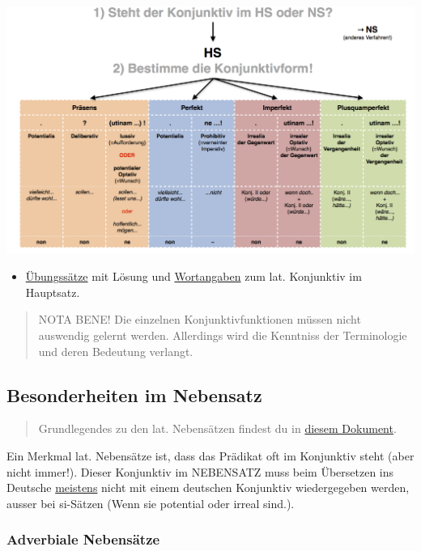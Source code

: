 \documentclass{scrartcl}
\begin{document}
\begin{center}
\includegraphics[width=.9\linewidth]{KonjHS.jpg}
\label{org364b6e5}
\end{center} 

\begin{itemize}
\item \href{https://www.dropbox.com/s/sltkmozc04i5xwl/Konjunktiv.pdf?dl=0}{Übungssätze} mit Lösung und \href{https://www.dropbox.com/s/uicgeuj6n24kj97/Konjunktiv\_Wortangaben.pdf?dl=0}{Wortangaben} zum lat. Konjunktiv im
Hauptsatz.
\end{itemize}

\begin{quote}
NOTA BENE!
Die einzelnen Konjunktivfunktionen müssen nicht auswendig gelernt werden.
Allerdings wird die Kenntniss der Terminologie und deren Bedeutung verlangt.
\end{quote}

\subsection{Besonderheiten im Nebensatz}
\label{sec:org162e264}

\begin{quote}
Grundlegendes zu den lat. Nebensätzen findest du in \href{https://www.dropbox.com/s/fw6yy5i00lxn5iy/Lat\_Nebens\%25C3\%25A4tze.pdf?dl=0}{diesem Dokument}.
\end{quote}


Ein Merkmal lat. Nebensätze ist, dass das Prädikat oft im Konjunktiv
steht (aber nicht immer!). Dieser Konjunktiv im NEBENSATZ muss beim
Übersetzen ins Deutsche \uline{meistens} nicht mit einem deutschen Konjunktiv
wiedergegeben werden, ausser bei si-Sätzen (Wenn sie potential oder irreal sind.).

\subsubsection{Adverbiale Nebensätze}
\label{sec:org0fb3648}
\end{document}
